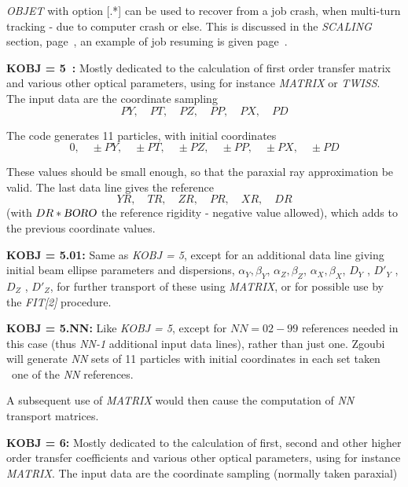 \noindent \textsl{OBJET} with option [.*] can be used to recover from a job 
crash, when multi-turn tracking  - due to computer crash or else. This is discussed in the 
\textsl{SCALING} section, page~\pageref{SCALING}, an example of job resuming is given  page~\pageref{ExaOBJ3Recovery}. 

\bigskip


\noindent\textbf{KOBJ = 5~:} Mostly dedicated to the calculation of first order
transfer matrix and various other  optical parameters, 
 using for instance \textsl{MATRIX} or \textsl{TWISS}.  
The input data are the coordinate sampling 
\smallskip
$$ PY,\quad PT,\quad PZ,\quad PP, \quad PX, \quad PD $$

\noindent The code generates  11 particles,  with initial coordinates 
$$ 0,\quad \pm PY,\quad \pm PT,\quad \pm PZ,\quad \pm PP, \quad \pm PX, \quad \pm PD $$

\noindent These values should be small enough, so that the paraxial ray
approximation be valid. 
 The last data line gives  the reference 
$$YR, \quad TR, \quad ZR, \quad PR, \quad XR, \quad DR $$
(with $ DR\ast \textsl{BORO}$  the reference rigidity - negative value allowed), which adds to the previous 
coordinate  values.


\bigskip

\noindent\textbf{KOBJ = 5.01:} Same as \textsl{KOBJ = 5}, except for an additional data line giving 
initial beam ellipse parameters and  dispersions,  
$\alpha_Y, \beta_Y$, $\alpha_Z, \beta_Z$, $\alpha_X, \beta_X$, $D_Y$ , $D'_Y$ , $D_Z$ , $D'_Z$,  
 for further transport of these using \textsl{MATRIX}, or for  possible use by the \textsl{FIT[2]} procedure. 

\bigskip

\noindent\textbf{KOBJ = 5.NN:} Like \textsl{KOBJ = 5}, except for  $NN = 02 - 99$ references needed in this case 
(thus \textsl{NN-1} additional input data lines), rather than just one. 
Zgoubi will generate  \textsl{NN} sets of 11 particles with initial  coordinates in each set taken \wrt\ one 
of the  \textsl{NN} references. 

\medskip 

\noindent A subsequent use of \textsl{MATRIX}  would then cause the computation of \textsl{NN} transport matrices. 


\bigskip

\noindent\textbf{KOBJ = 6:}  Mostly dedicated to the calculation of first, second
and other higher order transfer coefficients and various other  optical parameters, 
using for instance \textsl{MATRIX}. 
The input data are the coordinate sampling (normally taken paraxial)  

